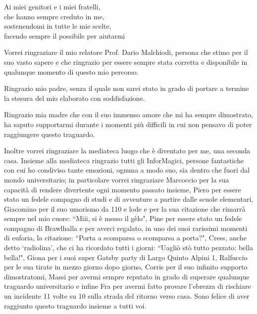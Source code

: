 \documentclass[12pt,italian]{report}
\begin{document}
\frontespizio
\beforepreface

% 
%
{\raggedleft \large \sl 
	
	\vspace{2cm}
	
	Ai miei genitori e i miei fratelli,\\che hanno sempre creduto in me, \\sostenendomi in tutte le mie scelte, \\facendo sempre il possibile per aiutarmi
	
	
}
         

Vorrei ringraziare il mio relatore Prof. Dario Malchiodi, persona che stimo per il suo vasto sapere e che ringrazio per essere sempre stata corretta e disponibile in qualunque momento di questo mio percorso. 
\bigskip

\noindent Ringrazio mio padre, senza il quale non sarei stato in grado di portare a termine la stesura del mio elaborato con soddisfazione.

\bigskip

\noindent Ringrazio mia madre che con il suo immenso amore che mi ha sempre dimostrato, ha saputo supportarmi durante i momenti più difficili in cui non pensavo di poter raggiungere questo traguardo.
\bigskip

\noindent Inoltre vorrei ringraziare la mediateca luogo che è diventato per me, una seconda casa. Insieme alla mediateca ringrazio tutti gli InforMagici, persone fantastiche con cui ho condiviso tante emozioni, ognuna a modo suo, sia dentro che fuori dal mondo universitario; in particolare vorrei ringraziare Marcoccio per la sua capacità di rendere divertente ogni momento passato insieme, Piero per essere stato un fedele compagno di studi e di avventure a partire dalle scuole elementari, Giacomino per il suo umorismo da 110 e lode e per la sua citazione che rimarrà sempre nel mio cuore: ``Miii, si è messo il gèlo", Pine per essere stato un fedele compagno di Brawlhalla e per averci regalato, in uno dei suoi rarissimi momenti di euforia, la citazione: ``Porta a scomparsa o scomparsa a porta?", Cress, anche detto `radiolina', che ci ha ricordato tutti i giorni: ``Uagliò stò tutto pezzato: bella bella!", Giona per i suoi super Gatsby party di Largo Quinto Alpini 1, Ralfuccio per le sua tirate in mezzo giorno dopo giorno, Corris per il suo infinito supporto dimostratomi, Massi per avermi sempre reputato in grado di superare qualunque traguardo universitario e infine Fra per avermi fatto provare l'ebrezza di rischiare un incidente 11 volte su 10 sulla strada del ritorno verso casa. Sono felice di aver raggiunto questo traguardo insieme a tutti voi.
\end{document}
